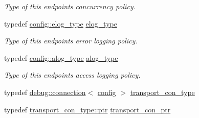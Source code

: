 \begin{DoxyCompactItemize}
\begin{DoxyCompactList}\small\item\em Type of this endpoint\textquotesingle{}s concurrency policy. \end{DoxyCompactList}\item 
typedef \hyperlink{classwebsocketpp_1_1log_1_1stub}{config\+::elog\+\_\+type} \hyperlink{classwebsocketpp_1_1transport_1_1debug_1_1endpoint_a3616bf82ba2a1026fad9de8145bd9375}{elog\+\_\+type}\hypertarget{classwebsocketpp_1_1transport_1_1debug_1_1endpoint_a3616bf82ba2a1026fad9de8145bd9375}{}\label{classwebsocketpp_1_1transport_1_1debug_1_1endpoint_a3616bf82ba2a1026fad9de8145bd9375}

\begin{DoxyCompactList}\small\item\em Type of this endpoint\textquotesingle{}s error logging policy. \end{DoxyCompactList}\item 
typedef \hyperlink{classwebsocketpp_1_1log_1_1stub}{config\+::alog\+\_\+type} \hyperlink{classwebsocketpp_1_1transport_1_1debug_1_1endpoint_ab2b8a06c2ba2a9ae26def00aefcbc930}{alog\+\_\+type}\hypertarget{classwebsocketpp_1_1transport_1_1debug_1_1endpoint_ab2b8a06c2ba2a9ae26def00aefcbc930}{}\label{classwebsocketpp_1_1transport_1_1debug_1_1endpoint_ab2b8a06c2ba2a9ae26def00aefcbc930}

\begin{DoxyCompactList}\small\item\em Type of this endpoint\textquotesingle{}s access logging policy. \end{DoxyCompactList}\item 
typedef \hyperlink{classwebsocketpp_1_1transport_1_1debug_1_1connection}{debug\+::connection}$<$ \hyperlink{classconfig}{config} $>$ \hyperlink{classwebsocketpp_1_1transport_1_1debug_1_1endpoint_a267bc670b0cecf80aa39ee266785e9ba}{transport\+\_\+con\+\_\+type}
\item 
typedef \hyperlink{classwebsocketpp_1_1transport_1_1debug_1_1connection_a40631f93557c3308c2c8c7897e6a4825}{transport\+\_\+con\+\_\+type\+::ptr} \hyperlink{classwebsocketpp_1_1transport_1_1debug_1_1endpoint_ab261a090fca072aea9b5dba04aba4c6d}{transport\+\_\+con\+\_\+ptr}
\end{DoxyCompactItemize}
